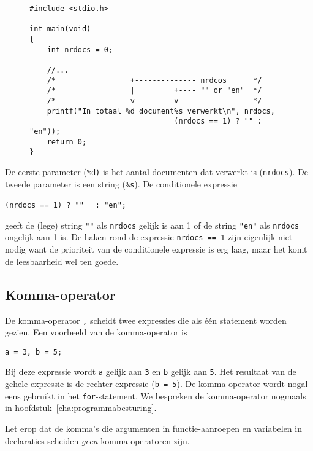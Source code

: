 \begin{figure}[!ht]
\begin{lstlisting}[caption=Het afdrukken van een meervoudsvorm.,label=cod:varnrdocs]
#include <stdio.h>

int main(void)
{
    int nrdocs = 0;

    //...
    /*                 +-------------- nrdcos      */
    /*                 |         +---- "" or "en"  */
    /*                 v         v                 */
    printf("In totaal %d document%s verwerkt\n", nrdocs,
                                 (nrdocs == 1) ? "" : "en"));
    return 0;
}
\end{lstlisting}
\end{figure} 

De eerste parameter (\texttt{\%d)} is het aantal documenten dat verwerkt is (\texttt{nrdocs}). De tweede parameter is een string (\texttt{\%s}). De conditionele expressie

\hspace*{1em}\lstinline[basicstyle=\ttfamily]|(nrdocs == 1) ? "" | \lstinline[basicstyle=\ttfamily]| : "en";|

geeft de (lege) string \lstinline[basicstyle=\ttfamily]|""| als \texttt{nrdocs} gelijk is aan 1 of de string \lstinline[basicstyle=\ttfamily]|"en"| als \texttt{nrdocs} ongelijk aan 1 is. De haken rond de expressie \texttt{nrdocs == 1} zijn eigenlijk niet nodig want de prioriteit van de conditionele expressie is erg laag, maar het komt de leesbaarheid wel ten goede.

\subsection{Komma-operator}
De komma-operator\indexop{,} \texttt{,} scheidt twee expressies die als één statement worden gezien. Een voorbeeld van de komma-operator is

\hspace*{1em}\texttt{a = 3, b = 5;}

Bij deze expressie wordt \texttt{a} gelijk aan \texttt{3} en \texttt{b} gelijk aan \texttt{5}. Het resultaat van de gehele expressie is de rechter expressie (\texttt{b = 5}). De komma-operator wordt nogal eens gebruikt in het \texttt{for}-statement. We bespreken de komma-operator nogmaals in hoofdstuk~\ref{cha:programmabesturing}.

Let erop dat de komma's die argumenten in functie-aanroepen en variabelen in declaraties scheiden \textsl{geen} komma-operatoren zijn.

